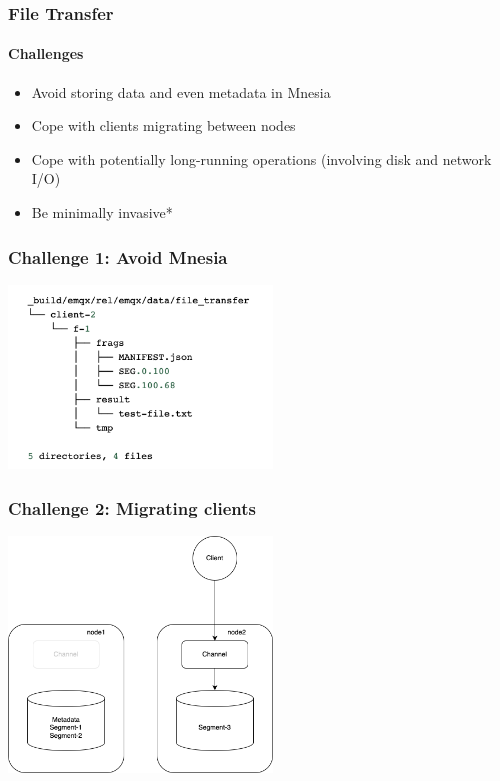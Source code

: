 \documentclass{beamer}
\begin{document}
\begin{frame}
    \frametitle{File Transfer}
    \framesubtitle{Challenges}

    \begin{center}
        \begin{itemize}
            \item Avoid storing data and even metadata in Mnesia
            \item Cope with clients migrating between nodes
            \item Cope with potentially long-running operations (involving disk and network I/O)
            \item Be minimally invasive*
        \end{itemize}
    \end{center}
\end{frame}

\begin{frame}
    \frametitle{Challenge 1: Avoid Mnesia}

    \begin{center}
        \includegraphics[width=7cm, keepaspectratio]{images/fs-structure.png}
    \end{center}
\end{frame}

\begin{frame}
    \frametitle{Challenge 2: Migrating clients}

    \begin{center}
        \includegraphics[width=7cm, keepaspectratio]{images/migrating-client.png}
    \end{center}
\end{frame}
\end{document}
